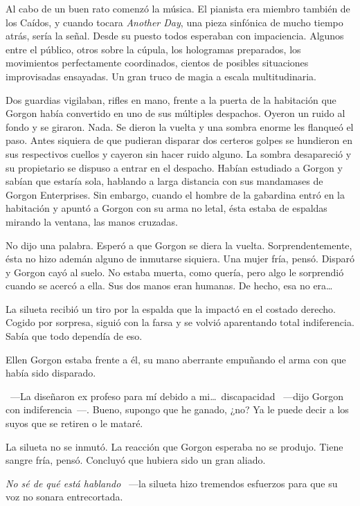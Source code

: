 \parbreak
Al cabo de un buen rato comenzó la música. El pianista era miembro también de los Caídos, y cuando tocara \emph{Another Day}, una pieza sinfónica de mucho tiempo atrás, sería la señal. Desde su puesto todos esperaban con impaciencia. Algunos entre el público, otros sobre la cúpula, los hologramas preparados, los movimientos perfectamente coordinados, cientos de posibles situaciones improvisadas ensayadas. Un gran truco de magia a escala multitudinaria.

Dos guardias vigilaban, rifles en mano, frente a la puerta de la habitación que Gorgon había convertido en uno de sus múltiples despachos. Oyeron un ruido al fondo y se giraron. Nada. Se dieron la vuelta y una sombra enorme les flanqueó el paso. Antes siquiera de que pudieran disparar dos certeros golpes se hundieron en sus respectivos cuellos y cayeron sin hacer ruido alguno. La sombra desapareció y su propietario se dispuso a entrar en el despacho. Habían estudiado a Gorgon y sabían que estaría sola, hablando a larga distancia con sus mandamases de Gorgon Enterprises. Sin embargo, cuando el hombre de la gabardina entró en la habitación y apuntó a Gorgon con su arma no letal, ésta estaba de espaldas mirando la ventana, las manos cruzadas.

No dijo una palabra. Esperó a que Gorgon se diera la vuelta. Sorprendentemente, ésta no hizo ademán alguno de inmutarse siquiera. Una mujer fría, pensó. Disparó y Gorgon cayó al suelo. No estaba muerta, como quería, pero algo le sorprendió cuando se acercó a ella. Sus dos manos eran humanas. De hecho, esa no era\dots

La silueta recibió un tiro por la espalda que la impactó en el costado derecho. Cogido por sorpresa, siguió con la farsa y se volvió aparentando total indiferencia. Sabía que todo dependía de eso.

Ellen Gorgon estaba frente a él, su mano aberrante empuñando el arma con que había sido disparado.

~---La diseñaron ex profeso para mí debido a mi\dots\ discapacidad ~---dijo Gorgon con indiferencia~---. Bueno, supongo que he ganado, ¿no? Ya le puede decir a los suyos que se retiren o le mataré.

La silueta no se inmutó. La reacción que Gorgon esperaba no se produjo. Tiene sangre fría, pensó. Concluyó que hubiera sido un gran aliado.

\emph{No sé de qué está hablando} ~---la silueta hizo tremendos esfuerzos para que su voz no sonara entrecortada.

